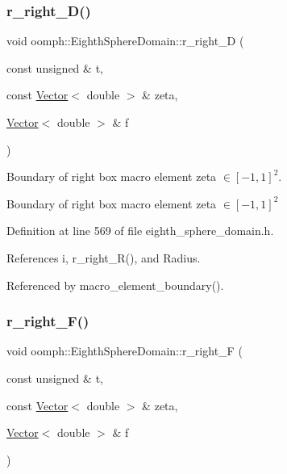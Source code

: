 \subsubsection{\texorpdfstring{r\+\_\+right\+\_\+\+D()}{r\_right\_D()}}
{\footnotesize\ttfamily void oomph\+::\+Eighth\+Sphere\+Domain\+::r\+\_\+right\+\_\+D (\begin{DoxyParamCaption}\item[{const unsigned \&}]{t,  }\item[{const \hyperlink{classoomph_1_1Vector}{Vector}$<$ double $>$ \&}]{zeta,  }\item[{\hyperlink{classoomph_1_1Vector}{Vector}$<$ double $>$ \&}]{f }\end{DoxyParamCaption})\hspace{0.3cm}{\ttfamily [private]}}



Boundary of right box macro element zeta $ \in [-1,1]^2 $. 

Boundary of right box macro element zeta $ \in [-1,1]^2 $ 

Definition at line 569 of file eighth\+\_\+sphere\+\_\+domain.\+h.



References i, r\+\_\+right\+\_\+\+R(), and Radius.



Referenced by macro\+\_\+element\+\_\+boundary().

\mbox{\label{classoomph_1_1EighthSphereDomain_aa08635438bff5a3d377d45c8c9c2b377}} 
\subsubsection{\texorpdfstring{r\+\_\+right\+\_\+\+F()}{r\_right\_F()}}
{\footnotesize\ttfamily void oomph\+::\+Eighth\+Sphere\+Domain\+::r\+\_\+right\+\_\+F (\begin{DoxyParamCaption}\item[{const unsigned \&}]{t,  }\item[{const \hyperlink{classoomph_1_1Vector}{Vector}$<$ double $>$ \&}]{zeta,  }\item[{\hyperlink{classoomph_1_1Vector}{Vector}$<$ double $>$ \&}]{f }\end{DoxyParamCaption})\hspace{0.3cm}{\ttfamily [private]}}




